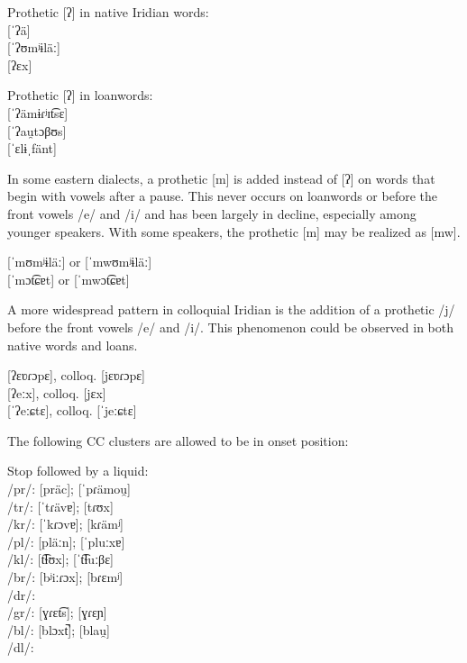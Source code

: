 \ex
Prothetic [ʔ] in native Iridian words:\\
 [ˈʔä]\\
 [ˈʔʊmʲɨläː]\\
 [ʔɛx]
\xe

\ex
Prothetic [ʔ] in loanwords:\\
 [ˈʔämɨɾʲɪt͡sɛ]\\
 [ˈʔau̯tɔβʊs] \\
 [ˈɛlɨˌfänt]
\xe

In some eastern dialects, a prothetic [m] is added instead of [ʔ] on words that
begin with vowels after a pause. This never occurs on loanwords or before the
front vowels /e/ and /i/ and has been largely in decline, especially among
younger speakers. With some speakers, the prothetic [m] may be realized as [mw].

\ex
{} [ˈmʊmʲɨläː] or [ˈmwʊmʲɨläː]\\
 [ˈmɔt͡ɕɐt] or [ˈmwɔt͡ɕɐt]
\xe

A more widespread pattern in colloquial Iridian is the addition of a prothetic
/j/ before the front vowels /e/ and /i/. This phenomenon could be observed in
both native words and loans.

\ex
{} [ʔɛʋɾɔpɛ], colloq. [jɛʋɾɔpɛ] \\
 [ʔeːx], colloq. [jɛx]\\
 [ˈʔeːɕtɛ], colloq. [ˈjeːɕtɛ]
\xe


The following CC clusters are allowed to be in onset position:

\pex
\a Stop followed by a liquid:\\
/pr/:  [präc];  [ˈpɾämou̯]\\
/tr/:  [ˈtɾävɐ];  [tɾʊx]\\
/kr/:  [ˈkɾɔvɐ];  [kɾämʲ]\\
/pl/:  [pläːn];  [ˈpluːxɐ]\\
/kl/:  [t͡ɬʊx];  [ˈt͡ɬuːβɛ]\\
/br/:  [bʲiːɾɔx];  [bɾɛmʲ]\\
/dr/: \\
/gr/:  [ɣɾɛt͡s];  [ɣɾɛɲ]\\
/bl/:  [blɔxt̚];  [blau̯]\\
/dl/:
\xe

